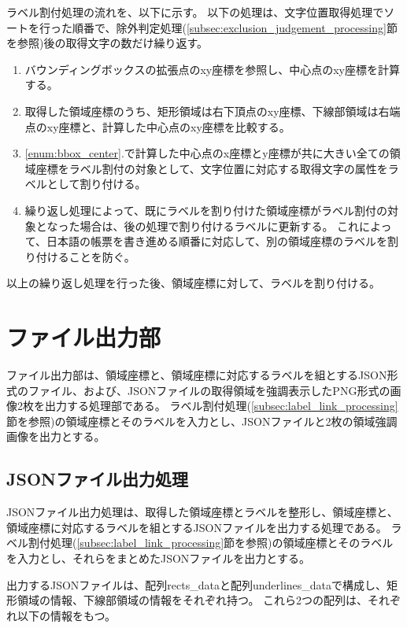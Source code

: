 ラベル割付処理の流れを、以下に示す。
以下の処理は、文字位置取得処理でソートを行った順番で、除外判定処理(\ref{subsec:exclusion_judgement_processing}節を参照)後の取得文字の数だけ繰り返す。

\begin{enumerate}
    \item \label{enum:bbox_center} バウンディングボックスの拡張点のxy座標を参照し、中心点のxy座標を計算する。
    \item 取得した領域座標のうち、矩形領域は右下頂点のxy座標、下線部領域は右端点のxy座標と、計算した中心点のxy座標を比較する。
    \item \ref{enum:bbox_center}.で計算した中心点のx座標とy座標が共に大きい全ての領域座標をラベル割付の対象として、文字位置に対応する取得文字の属性をラベルとして割り付ける。
    \item 繰り返し処理によって、既にラベルを割り付けた領域座標がラベル割付の対象となった場合は、後の処理で割り付けるラベルに更新する。
          これによって、日本語の帳票を書き進める順番に対応して、別の領域座標のラベルを割り付けることを防ぐ。
\end{enumerate}

以上の繰り返し処理を行った後、領域座標に対して、ラベルを割り付ける。

\section{ファイル出力部}\label{subsec:file_output_part}
ファイル出力部は、領域座標と、領域座標に対応するラベルを組とするJSON形式のファイル、および、JSONファイルの取得領域を強調表示したPNG形式の画像2枚を出力する処理部である。
ラベル割付処理(\ref{subsec:label_link_processing}節を参照)の領域座標とそのラベルを入力とし、JSONファイルと2枚の領域強調画像を出力とする。

\subsection{JSONファイル出力処理}\label{subsec:json_file_output_processing}
JSONファイル出力処理は、取得した領域座標とラベルを整形し、領域座標と、領域座標に対応するラベルを組とするJSONファイルを出力する処理である。
ラベル割付処理(\ref{subsec:label_link_processing}節を参照)の領域座標とそのラベルを入力とし、それらをまとめたJSONファイルを出力とする。

出力するJSONファイルは、配列rects\_dataと配列underlines\_dataで構成し、矩形領域の情報、下線部領域の情報をそれぞれ持つ。
これら2つの配列は、それぞれ以下の情報をもつ。

